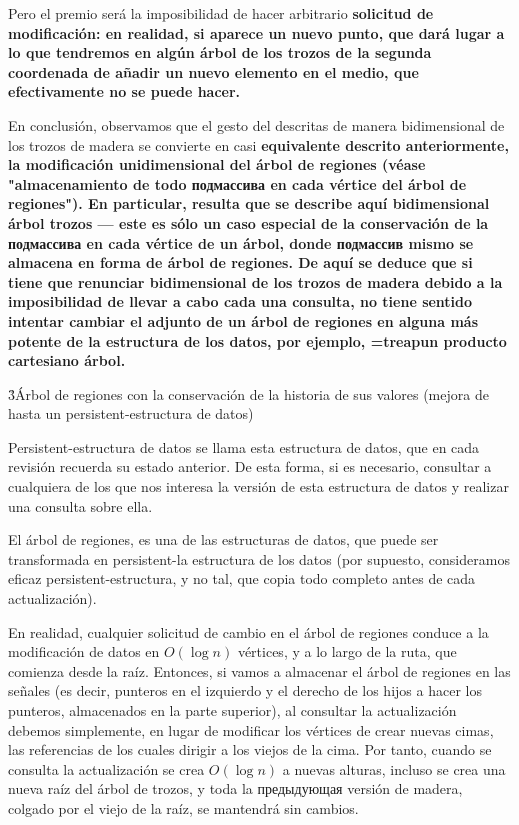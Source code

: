 Pero el premio será la imposibilidad de hacer arbitrario \bf{solicitud de modificación}: en realidad, si aparece un nuevo punto, que dará lugar a lo que tendremos en algún árbol de los trozos de la segunda coordenada de añadir un nuevo elemento en el medio, que efectivamente no se puede hacer.

En conclusión, observamos que el gesto del descritas de manera bidimensional de los trozos de madera se convierte en casi \bf{equivalente} descrito anteriormente, la modificación unidimensional del árbol de regiones (véase "almacenamiento de todo подмассива en cada vértice del árbol de regiones"). En particular, resulta que se describe aquí bidimensional árbol trozos --- este es sólo un caso especial de la conservación de la подмассива en cada vértice de un árbol, donde подмассив mismo se almacena en forma de árbol de regiones. De aquí se deduce que si tiene que renunciar bidimensional de los trozos de madera debido a la imposibilidad de llevar a cabo cada una consulta, no tiene sentido intentar cambiar el adjunto de un árbol de regiones en alguna más potente de la estructura de los datos, por ejemplo, \algohref=treap{un producto cartesiano árbol}.


\h3{Árbol de regiones con la conservación de la historia de sus valores (mejora de hasta un persistent-estructura de datos)}

Persistent-estructura de datos se llama esta estructura de datos, que en cada revisión recuerda su estado anterior. De esta forma, si es necesario, consultar a cualquiera de los que nos interesa la versión de esta estructura de datos y realizar una consulta sobre ella.

El árbol de regiones, es una de las estructuras de datos, que puede ser transformada en persistent-la estructura de los datos (por supuesto, consideramos eficaz persistent-estructura, y no tal, que copia todo completo antes de cada actualización).

En realidad, cualquier solicitud de cambio en el árbol de regiones conduce a la modificación de datos en $O (\log n)$ vértices, y a lo largo de la ruta, que comienza desde la raíz. Entonces, si vamos a almacenar el árbol de regiones en las señales (es decir, punteros en el izquierdo y el derecho de los hijos a hacer los punteros, almacenados en la parte superior), al consultar la actualización debemos simplemente, en lugar de modificar los vértices de crear nuevas cimas, las referencias de los cuales dirigir a los viejos de la cima. Por tanto, cuando se consulta la actualización se crea $O (\log n)$ a nuevas alturas, incluso se crea una nueva raíz del árbol de trozos, y toda la предыдующая versión de madera, colgado por el viejo de la raíz, se mantendrá sin cambios.

